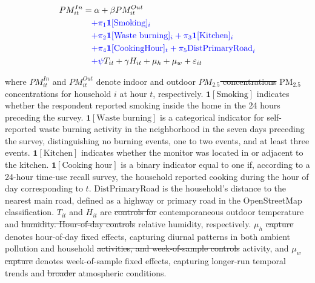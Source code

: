 \documentclass[reqno,12pt,notitlepage]{article}
\providecommand{\DIFadd}[1]{{\protect\color{BLUE}#1}} %
\providecommand{\DIFdel}[1]{{\protect\color{red}\sout{#1}}} %
\providecommand{\DIFaddbegin}{} %
\providecommand{\DIFaddend}{} %
\providecommand{\DIFdelbegin}{} %
\providecommand{\DIFdelend}{} %
\begin{document}
\begin{align}
\label{eq:infiltration}
    PM^{In}_{it} &= \alpha + \beta PM^{Out}_{it}  \DIFaddbegin \\
    &\quad \DIFadd{+ \pi_1 \mathbf{1}[\text{Smoking}]_i } \notag \\ &\DIFadd{\quad+ \pi_2 \mathbf{1}[\text{Waste burning}]_i + \pi_3 \mathbf{1}[\text{Kitchen}]_i } \notag \\ &\DIFadd{\quad + \pi_4 \mathbf{1}[\text{CookingHour}]_t + \pi_5 \text{DistPrimaryRoad}_i } \notag \\ &\DIFadd{\quad+ \psi }\DIFaddend T_{it} + \gamma H_{it} + \mu_h + \mu_w + \varepsilon_{it} \notag
\end{align}

where $PM^{In}_{it}$ and $PM^{Out}_{it}$ denote indoor and outdoor \DIFdelbegin \DIFdel{$PM_{2.5}$ concentrations }\DIFdelend \DIFaddbegin \DIFadd{PM$_{2.5}$ 
concentrations for household $i$ at hour $t$}\DIFaddend , respectively. 
\DIFaddbegin \DIFadd{$\mathbf{1}[\text{Smoking}]$ indicates whether the respondent reported smoking 
inside the home in the 24 hours preceding the survey. 
$\mathbf{1}[\text{Waste burning}]$ is a categorical indicator for self-reported waste burning activity in the neighborhood in the seven days preceding the survey, 
distinguishing no burning events, one to two events, and at least three events. 
$\mathbf{1}[\text{Kitchen}]$ indicates whether the monitor was located in or  adjacent to the kitchen. 
$\mathbf{1}[\text{Cooking hour}]$ is a binary indicator equal to one if, according to a 24-hour time-use recall survey, the household reported cooking during the hour of day corresponding to $t$. 
$\text{DistPrimaryRoad}$ is the household's distance to the nearest main road, defined as a highway or primary road in the OpenStreetMap classification. 
}\DIFaddend $T_{it}$ and $H_{it}$ are \DIFdelbegin \DIFdel{controls for }\DIFdelend contemporaneous outdoor temperature and \DIFdelbegin \DIFdel{humidity. Hour-of-day controls }\DIFdelend \DIFaddbegin \DIFadd{relative 
humidity, respectively. 
}\DIFaddend $\mu_h$ \DIFdelbegin \DIFdel{capture }\DIFdelend \DIFaddbegin \DIFadd{denotes hour-of-day fixed effects, capturing }\DIFaddend diurnal patterns in \DIFaddbegin \DIFadd{both 
ambient }\DIFaddend pollution and household \DIFdelbegin \DIFdel{activities, and week-of-sample controls }\DIFdelend \DIFaddbegin \DIFadd{activity, and }\DIFaddend $\mu_w$ \DIFdelbegin \DIFdel{capture }\DIFdelend \DIFaddbegin \DIFadd{denotes week-of-sample  fixed effects, capturing longer-run }\DIFaddend temporal trends and \DIFdelbegin \DIFdel{broader }\DIFdelend atmospheric conditions.
\end{document}
